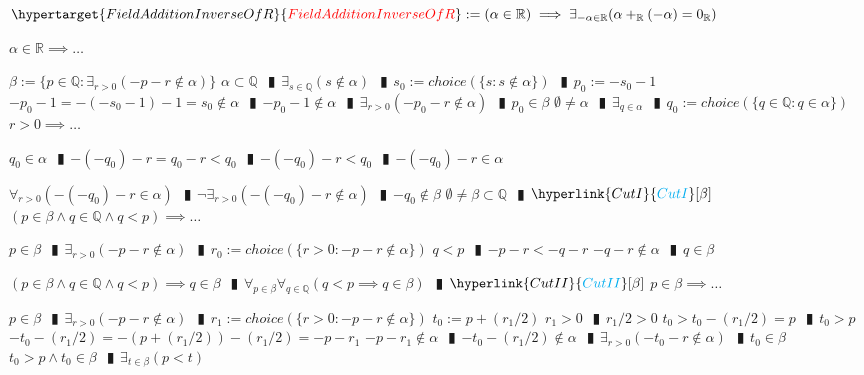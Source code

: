 \documentclass{book}
\newcommand{\df}[1]{\hypertarget{#1}{\textcolor{red}{#1}}}
\newcommand{\rf}[1]{\hyperlink{#1}{\textcolor{cyan}{#1}}}
\newcommand{\abr}{:=}
\newcommand{\pipe}{$\phantom{(}\vrectangleblack\phantom{)}$}
\begin{document}
$\df{FieldAdditionInverseOfR} \abr (\alpha \in \mathbb{R}) \implies \exists_{-\alpha \in \mathbb{R}}(\alpha +_{\mathbb{R}} (-\alpha) = 0_{\mathbb{R}})$
\begin{enumerate}
  \lit $\alpha \in \mathbb{R} \implies \ldots$
  \begin{enumerate}
    \lit $\beta \abr \{p \in \mathbb{Q} : \exists_{r > 0}(-p - r \notin \alpha)\}$
    \lit $\alpha \subset \mathbb{Q}$ \pipe $\exists_{s \in \mathbb{Q}}(s \notin \alpha)$ \pipe $s_0 \abr choice(\{s : s \notin \alpha\})$ \pipe $p_0 \abr -s_0 - 1$
    \lit $-p_0 - 1 = -(-s_0 - 1) - 1 = s_0 \notin \alpha$ \pipe $-p_0 - 1 \notin \alpha$ \pipe $\exists_{r > 0}(-p_0 - r \notin \alpha)$ \pipe $p_0 \in \beta$
    \lit $\emptyset \neq \alpha$ \pipe $\exists_{q \in \alpha}$ \pipe $q_0 \abr choice(\{q \in \mathbb{Q} : q \in \alpha\})$
    \lit $r > 0 \implies \ldots$
    \begin{enumerate}
      \lit $q_0 \in \alpha$ \pipe $-(-q_0) - r = q_0 - r < q_0$ \pipe $-(-q_0) - r < q_0$ \pipe $-(-q_0) - r \in \alpha$
    \end{enumerate}
    \lit $\forall_{r > 0}(-(-q_0) - r \in \alpha)$ \pipe $\lnot \exists_{r > 0}(-(-q_0) -r \notin \alpha)$ \pipe $-q_0 \notin \beta$
    \lit $\emptyset \neq \beta \subset \mathbb{Q}$ \pipe $\rf{CutI}[\beta]$
    \lit $(p \in \beta \land q \in \mathbb{Q} \land q < p) \implies \ldots$
    \begin{enumerate}
      \lit $p \in \beta$ \pipe $\exists_{r > 0}(-p - r \notin \alpha)$ \pipe $r_0 \abr choice(\{r > 0 : -p - r \notin \alpha\})$
      \lit $q < p$ \pipe $-p - r < -q - r$
      \lit $-q -r \notin \alpha$ \pipe $q \in \beta$
    \end{enumerate}
    \lit $(p \in \beta \land q \in \mathbb{Q} \land q < p) \implies q \in \beta$ \pipe $\forall_{p \in \beta} \forall_{q \in \mathbb{Q}}(q < p \implies q \in \beta)$ \pipe $\rf{CutII}[\beta]$
    \lit $p \in \beta \implies \ldots$
    \begin{enumerate}
      \lit $p \in \beta$ \pipe $\exists_{r > 0}(-p - r \notin \alpha)$ \pipe $r_1 \abr choice(\{r > 0 : -p - r \notin \alpha\})$
      \lit $t_0 \abr p + (r_1 / 2)$
      \lit $r_1 > 0$ \pipe $r_1 / 2 > 0$
      \lit $t_0 > t_0 - (r_1 / 2) = p$ \pipe $t_0 > p$
      \lit $-t_0 - (r_1 / 2) = -(p + (r_1 / 2)) - (r_1 / 2) = -p - r_1$
      \lit $-p - r_1 \notin \alpha$ \pipe $-t_0 - (r_1 / 2) \notin \alpha$ \pipe $\exists_{r > 0}(-t_0 - r \notin \alpha)$ \pipe $t_0 \in \beta$
      \lit $t_0 > p \land t_0 \in \beta$ \pipe $\exists_{t \in \beta}(p < t)$

\end{enumerate}
\end{enumerate}
\end{enumerate}
\end{document}
